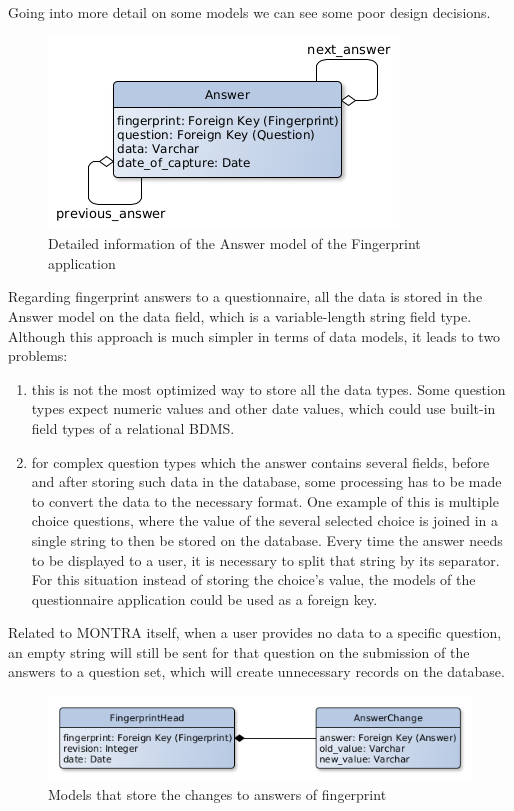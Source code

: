 
Going into more detail on some models we can see some poor design decisions.

\begin{figure}
    \center
    \includegraphics[width=.4\linewidth]{answer-model}
    \caption{Detailed information of the Answer model of the Fingerprint application}
    \label{fig:answer-model}
\end{figure}

Regarding fingerprint answers to a questionnaire, all the data is stored in the Answer model on the data field, which is a variable-length string field type.
Although this approach is much simpler in terms of data models, it leads to two problems:
\begin{enumerate}
    \item this is not the most optimized way to store all the data types.
        Some question types expect numeric values and other date values, which could use built-in field types of a relational BDMS.
    \item for complex question types which the answer contains several fields, before and after storing such data in the database, some processing has to be made to convert the data to the necessary format.
        One example of this is multiple choice questions, where the value of the several selected choice is joined in a single string to then be stored on the database.
        Every time the answer needs to be displayed to a user, it is necessary to split that string by its separator.
        For this situation instead of storing the choice's value, the models of the questionnaire application could be used as a foreign key.
\end{enumerate}

Related to MONTRA itself, when a user provides no data to a specific question, an empty string will still be sent for that question on the submission of the answers to a question set, which will create unnecessary records on the database.

\begin{figure}
    \center
    \includegraphics[width=.6\linewidth]{answer-changes-models}
    \caption{Models that store the changes to answers of fingerprint}
    \label{fig:answer-changes-models}
\end{figure}

